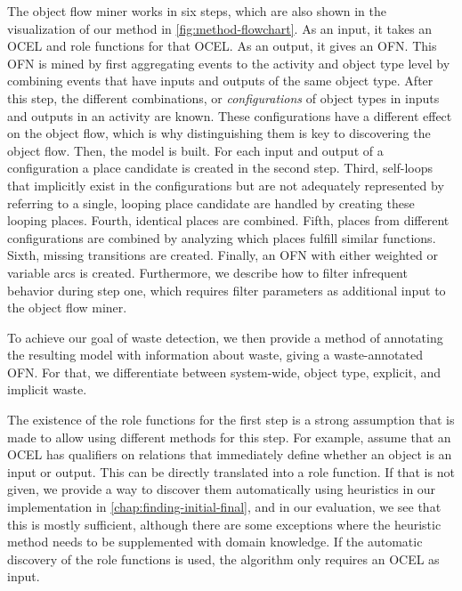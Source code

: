 The object flow miner works in six steps, which are also shown in the visualization of our method in \autoref{fig:method-flowchart}.
As an input, it takes an OCEL and role functions for that OCEL.
As an output, it gives an OFN.
This OFN is mined by first aggregating events to the activity and object type level by combining events that have inputs and outputs of the same object type.
After this step, the different combinations, or \emph{configurations} of object types in inputs and outputs in an activity are known.
These configurations have a different effect on the object flow, which is why distinguishing them is key to discovering the object flow.
Then, the model is built.
For each input and output of a configuration a place candidate is created in the second step.
Third, self-loops that implicitly exist in the configurations but are not adequately represented by referring to a single, looping place candidate are handled by creating these looping places.
Fourth, identical places are combined.
Fifth, places from different configurations are combined by analyzing which places fulfill similar functions.
Sixth, missing transitions are created.
Finally, an OFN with either weighted or variable arcs is created.
Furthermore, we describe how to filter infrequent behavior during step one, which requires filter parameters as additional input to the object flow miner.



To achieve our goal of waste detection, we then provide a method of annotating the resulting model with information about waste, giving a waste-annotated OFN.
For that, we differentiate between system-wide, object type, explicit, and implicit waste.



The existence of the role functions for the first step is a strong assumption that is made to allow using different methods for this step.
For example, assume that an OCEL has qualifiers on relations that immediately define whether an object is an input or output.
This can be directly translated into a role function.
If that is not given, we provide a way to discover them automatically using heuristics in our implementation in \cref{chap:finding-initial-final}, and in our evaluation, we see that this is mostly sufficient, although there are some exceptions where the heuristic method needs to be supplemented with domain knowledge.
If the automatic discovery of the role functions is used, the algorithm only requires an OCEL as input.



